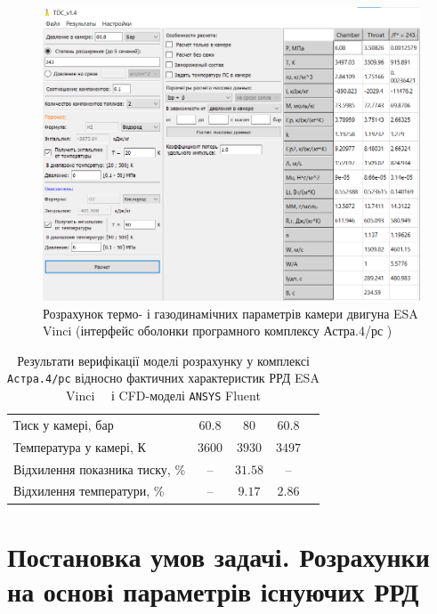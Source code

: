\begin{figure}
	\centering
	\includegraphics[width=0.7\textheight, angle=0,origin=c]{chapter_2/Vinci_1perc_pure.png}
	\caption{Розрахунок термо- і газодинамічних параметрів камери двигуна ESA Vinci (інтерфейс оболонки програмного комплексу Астра.4/рс )}
	\label{fig:Vinci_1perc_pure}
\end{figure}

\begin{table}[t!]\centering\small
	\caption{Результати верифікації моделі розрахунку у комплексі \texttt{Астра.4/рс} відносно фактичних характеристик РРД ESA Vinci~\cite{VinciData}~\cite{VinciDataDLR} і CFD-моделі \texttt{ANSYS} Fluent}
	\begin{tabular}{|l|c|c|c|c|}
		\hline
		\thead{} & \thead{Література} & \thead{Fluent} & \thead{Астра.4}\\
		\hline
		Тиск у камері, бар & $60.8$ & $80$ & $60.8$\\
		\hline
		Температура у камері, К & $3600$ & $3930$ & $3497$ \\
		\hline
		Відхилення показника тиску, \% & -- & $31.58$ & -- \\
		\hline
		Відхилення температури, \% & -- & $9.17$ & $2.86$ \\
		\hline
	\end{tabular}
	\label{tab_verification}
\end{table}


\section{Постановка умов задачі. Розрахунки на основі параметрів існуючих РРД}


